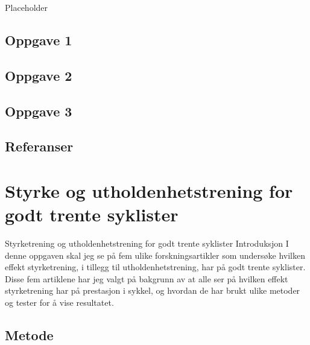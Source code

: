 \documentclass[
]{book}
\begin{document}
Placeholder

\hypertarget{oppgave-1}{%
\section{Oppgave 1}\label{oppgave-1}}

\hypertarget{oppgave-2}{%
\section{Oppgave 2}\label{oppgave-2}}

\hypertarget{oppgave-3}{%
\section{Oppgave 3}\label{oppgave-3}}

\hypertarget{referanser-1}{%
\section{Referanser}\label{referanser-1}}

\hypertarget{styrke-og-utholdenhetstrening-for-godt-trente-syklister}{%
\chapter{Styrke og utholdenhetstrening for godt trente syklister}\label{styrke-og-utholdenhetstrening-for-godt-trente-syklister}}

Styrketrening og utholdenhetstrening for godt trente syklister Introduksjon I denne oppgaven skal jeg se på fem ulike forskningsartikler som undersøke hvilken effekt styrketrening, i tillegg til utholdenhetstrening, har på godt trente syklister. Disse fem artiklene har jeg valgt på bakgrunn av at alle ser på hvilken effekt styrketrening har på prestasjon i sykkel, og hvordan de har brukt ulike metoder og tester for å vise resultatet.

\hypertarget{metode-1}{%
\section{Metode}\label{metode-1}}
\end{document}
